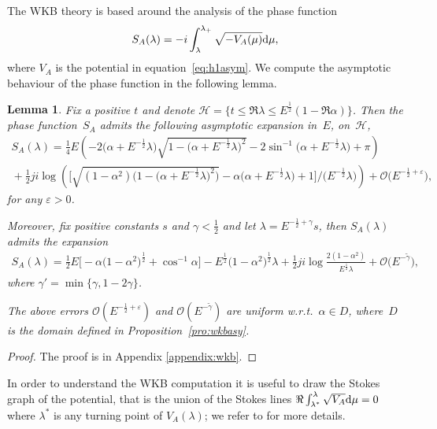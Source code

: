 \documentclass[pdftex]{sigma}
\numberwithin{equation}{section}
\newtheorem{lem}[thm]{Lemma}
\newcommand{\e}{\varepsilon}
\newcommand{\la}{\lambda}
\newcommand{\al}{\alpha}
\begin{document}
The WKB theory is based around the analysis of the phase function
\begin{gather*}%
S_A(\la)=-i\int_{\la}^{\la_+}\sqrt{-V_A(\mu)}{\rm d}\mu ,
\end{gather*}
where $V_A$ is the potential in equation~\eqref{eq:h1asym}. We compute the asymptotic behaviour of the phase function in the following lemma.
\begin{lem}\label{lem:phasefunction}
	Fix a positive $t$ and denote ${\mathcal{H}}=\lbrace t \leq {\Re \la} \leq E^{\frac12} (1-\Re\al)\rbrace $. Then the phase function~$S_A$ admits the following asymptotic expansion in~$E$, on~${\mathcal{H}}$,
	\begin{gather}\label{eq:phaseA}
	S_A(\la)=\tfrac{1}{4}E\left(-2 \big(\al+E^{-\frac12}\la\big) \sqrt{1-\big(\al+E^{-\frac12}\la\big)^2}
	-2\sin^{-1}\big(\al+E^{-\frac12}\la\big)+\pi \right)\\ \nonumber
	{}+\tfrac{1}{2}ji\log\left(
	\Big[\sqrt{(1-\al^2) \big(1-\big(\al+E^{-\frac12}\la\big)^2\big)}-\al \big(\al+E^{-\frac12}\la\big)+1 \Big]/\big(E^{-\frac12}\la\big) \right)+\mathcal{O}\big(E^{-\frac{1}{2}+\e}\big),
	\end{gather}
	for any $\e>0$.

	Moreover, f\/ix positive constants $s$ and $\gamma<\frac12$ and let $\la=E^{-\tfrac{1}{2}+\gamma} s$, then $S_A(\la)$ admits the expansion
	\begin{gather*}
	S_A(\la)=\tfrac{1}{2}E\big[-\al\big(1-\al^2\big)^{\frac12}+\cos^{-1}{\al}\big]-E^{\frac12}\big(1-\al^2\big)^{\frac12}\la +\tfrac{1}{2}ji \log{\frac{2(1-\al^2)}{E^{\frac12}\la}} +\mathcal{O}\big(E^{-\tilde{\gamma}}\big),%
\end{gather*}
	where $\gamma'=\min\lbrace \gamma, 1-2 \gamma \rbrace$.

The above errors $\mathcal{O}(E^{-\frac{1}{2}+\e})$ and $\mathcal{O}(E^{-\tilde{\gamma}})$ are uniform w.r.t.\ $\al \in D$, where~$D$ is the domain defined in Proposition~{\rm \ref{pro:wkbasy}}.
\end{lem}
\begin{proof}
	The proof is in Appendix \ref{appendix:wkb}.
\end{proof}


In order to understand the WKB computation it is useful to draw the Stokes graph of the potential,
that is the union of the Stokes lines $\Re\int_{\la^*}^\la \sqrt{V_A} {\rm d}\mu=0$ where $\la^*$ is any
turning point of $V_A(\la)$; we refer to \cite{piwkb} for more details.
\end{document}
